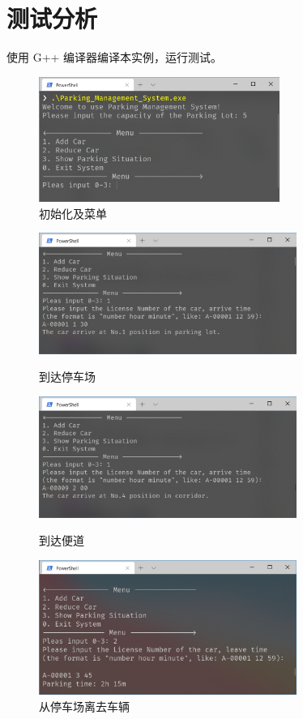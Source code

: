 \documentclass{ctexart}
\begin{document}
    \section{测试分析}
    使用 G++ 编译器编译本实例，运行测试。

    \begin{figure}[b]
        \centering
        \includegraphics[width=0.7\textwidth]{测试1.png}
        \caption{初始化及菜单}
    \end{figure}


    \begin{figure}
        \centering
        \includegraphics[width=0.75\textwidth]{测试2.png}
        \caption{到达停车场}
        \vspace{1em}
        \includegraphics[width=0.75\textwidth]{测试3.png}
        \caption{到达便道}
        \vspace{1em}
        \includegraphics[width=0.75\textwidth]{测试4.png}
        \caption{从停车场离去车辆}
    \end{figure}
\end{document}
